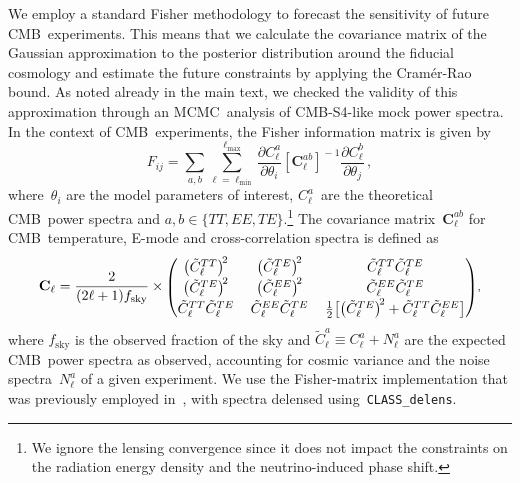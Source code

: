 \begin{subappendices}
We employ a standard Fisher methodology to forecast the sensitivity of future CMB~experiments. This means that we calculate the covariance matrix of the Gaussian approximation to the posterior distribution around the fiducial cosmology and estimate the future constraints by applying the Cramér-Rao bound. As noted already in the main text, we checked the validity of this approximation through an MCMC~analysis of \mbox{CMB-S4}-like mock power spectra. In the context of CMB~experiments, the Fisher information matrix is given by
\begin{equation}
	F_{ij} = \sum_{a,b}\sum^{\ell_\mathrm{max}}_{\ell=\ell_\mathrm{min}}\frac{\partial C^a_\ell}{\partial \theta_i} \left[\mathbf{C}^{a b}_\ell\right]^{\!-1} \frac{\partial C^b_\ell}{\partial \theta_j}\, ,	\label{ch12-eq:Fisher}
\end{equation}
where~$\theta_i$ are the model parameters of interest, $C_\ell^a$~are the theoretical CMB~power spectra and $a, b \in \{TT, EE, TE\}$.\footnote{We ignore the lensing convergence since it does not impact the constraints on the radiation energy density and the neutrino-induced phase shift.}
The covariance matrix~$\mathbf{C}^{ab}_\ell$ for CMB~temperature, E-mode and cross-correlation spectra is defined as
\begin{equation}
	\mathbf{C}_{\ell} = \frac{2}{(2 \ell+1) f_\mathrm{sky}} \times \,
	\begingroup
	\scriptstyle \renewcommand*{\arraystretch}{1.2} \setlength{\arraycolsep}{6pt}
	\begin{pmatrix}
		\bigl(\tilde{C}_\ell^{TT}\bigr)^{\!2}	& \bigl(\tilde{C}_\ell^{TE}\bigr)^{\!2}		& \tilde{C}_\ell^{TT} \tilde{C}_\ell^{TE}																	\\
		\bigl(\tilde{C}_\ell^{TE}\bigr)^{\!2}	& \bigl(\tilde{C}_\ell^{EE}\bigr)^{\!2}		& \tilde{C}_\ell^{EE} \tilde{C}_\ell^{TE}																	\\
		\tilde{C}_\ell^{TT} \tilde{C}_\ell^{TE}	& \tilde{C}_\ell^{EE} \tilde{C}_\ell^{TE}	& \frac{1}{2} \bigl[\bigl(\tilde{C}_\ell^{TE}\bigr)^{\!2} + \tilde{C}_\ell^{TT} \tilde{C}_\ell^{EE}\bigr]
	\end{pmatrix}
	\endgroup ,
	\label{ch12-eq:Fisher_covariance}
\end{equation}
where $f_\mathrm{sky}$ is the observed fraction of the sky and $\tilde{C}_\ell^a \equiv C_{\ell}^a + N_\ell^a$ are the expected CMB~power spectra as observed, accounting for cosmic variance and the noise spectra~$N_\ell^a$ of a given experiment. We use the Fisher-matrix implementation that was previously employed in~\cite{Baumann:2017gkg, Beutler:2019ojk}, with spectra delensed using~\texttt{CLASS\_delens}.\medskip


\end{subappendices}
